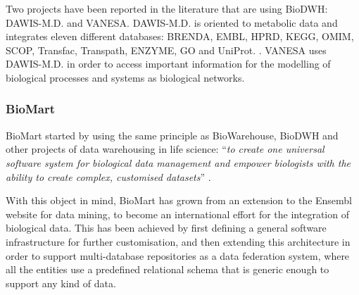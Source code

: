 Two projects have been reported in the literature that are using BioDWH: DAWIS-M.D. and VANESA. DAWIS-M.D. is oriented to metabolic data and integrates eleven different databases: BRENDA, EMBL, HPRD, KEGG, OMIM, SCOP, Transfac, Transpath, ENZYME, GO and UniProt. \cite{HIP2010}. VANESA uses DAWIS-M.D. in order to access important information for the modelling of biological processes and systems as biological networks\cite{BRI2014}.

\subsubsection{BioMart}
BioMart started by using the same principle as BioWarehouse, BioDWH and other projects of data warehousing in life science: ``\emph{to create one universal software system for biological data management and empower biologists with the ability to create complex, customised datasets}'' \cite{KAS2011}.

With this object in mind, BioMart has grown from an extension to the Ensembl website for data mining, to become an international effort for the integration of biological data. This has been achieved by first defining a general software infrastructure for further customisation, and then extending this architecture in order to support multi-database repositories as a data federation system, where all the entities use a predefined relational schema that is generic enough to support any kind of data.

